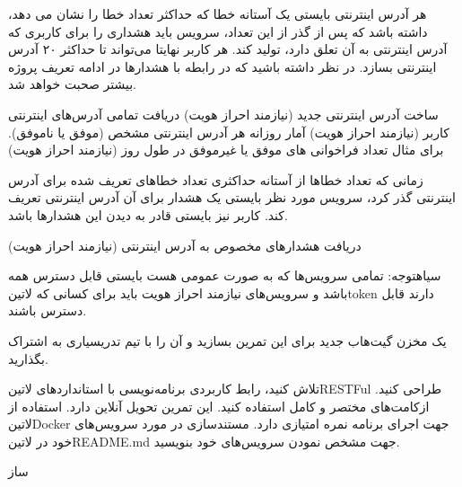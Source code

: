 \documentclass{../assignment}
\begin{document}

هر آدرس اینترنتی بایستی یک آستانه خطا که حداکثر تعداد خطا را نشان می دهد، داشته باشد که پس از گذر از این تعداد، سرویس باید هشداری را برای کاربری که آدرس اینترنتی به آن تعلق دارد، تولید کند.
هر کاربر نهایتا می‌تواند تا حداکثر ۲۰ آدرس اینترنتی بسازد.
در نظر داشته باشید که در رابطه با هشدارها در ادامه تعریف پروژه بیشتر صحبت خواهد شد.


 ساخت آدرس اینترنتی جدید (نیازمند احراز هویت)
 دریافت تمامی آدرس‌های اینترنتی کاربر (نیازمند احراز هویت)
 آمار روزانه هر آدرس اینترنتی مشخص (موفق یا ناموفق). برای مثال تعداد فراخوانی ‌های موفق یا غیرموفق در طول روز (نیازمند احراز هویت)


زمانی که تعداد خطاها از آستانه حداکثری تعداد خطاهای تعریف شده برای آدرس‌ اینترنتی گذر کرد، سرویس مورد نظر بایستی یک هشدار برای آن آدرس اینترنتی تعریف کند.
کاربر نیز بایستی قادر به دیدن این هشدارها باشد.


 دریافت هشدارهای مخصوص به آدرس اینترنتی (نیازمند احراز هویت)

‌سیاه{توجه: تمامی سرویس‌ها که به صورت عمومی هست بایستی قابل دسترس همه باشد و سرویس‌های نیازمند احراز هویت باید برای کسانی که ‌لاتین{token} دارند قابل دسترس باشند.}



یک مخزن گیت‌هاب جدید برای این تمرین بسازید و آن را با تیم تدریسیاری به اشتراک بگذارید.

 تلاش کنید، رابط کاربردی برنامه‌نویسی با استانداردهای ‌لاتین{RESTFul} طراحی کنید.
 ازکامت‌های مختصر و کامل استفاده کنید.
 این تمرین تحویل آنلاین دارد.
 استفاده از ‌لاتین{Docker} جهت اجرای برنامه نمره امتیازی دارد.
 مستندسازی در مورد سرویس‌های خود در ‌لاتین{README.md} جهت مشخص نمودن سرویس‌های خود بنویسید.

‌ساز
\end{document}
